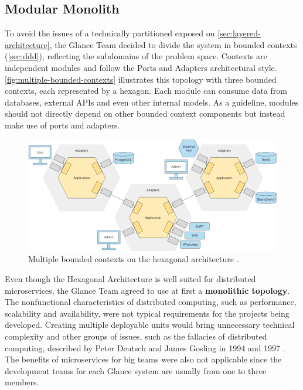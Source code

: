 \subsection{Modular Monolith}
\label{sec:modular-monolith}

To avoid the issues of a technically partitioned exposed on \autoref{sec:layered-architecture}, the Glance Team decided to divide the system in bounded contexts (\autoref{sec:ddd}), reflecting the subdomains of the problem space. Contexts are independent modules and follow the Ports and Adapters architectural style. \autoref{fig:multiple-bounded-contexts} illustrates this topology with three bounded contexts, each represented by a hexagon. Each module can consume data from databases, external APIs and even other internal models. As a guideline, modules should not directly depend on other bounded context components but instead make use of ports and adapters.

\begin{figure}[htbp]
  \centering
  \includegraphics[scale=0.5]{Imagens/chap04/multiple-bounded-contexts.png}
  \caption{Multiple bounded contexts on the hexagonal architecture \cite{sven-woltmann-hexagonal-architecture}.}
  \label{fig:multiple-bounded-contexts}
\end{figure}

Even though the Hexagonal Architecture is well suited for distributed microservices, the Glance Team agreed to use at first a \textbf{monolithic topology}. The nonfunctional characteristics of distributed computing, such as performance, scalability and availability, were not typical requirements for the projects being developed. Creating multiple deployable units would bring unnecessary technical complexity and other groups of issues, such as the fallacies of distributed computing, described by Peter Deutsch and James Gosling in 1994 and 1997 \cite{fallacies-of-distributed-computing} \cite{richards-architecture}. The benefits of microservices for big teams were also not applicable since the development teams for each Glance system are usually from one to three members.

